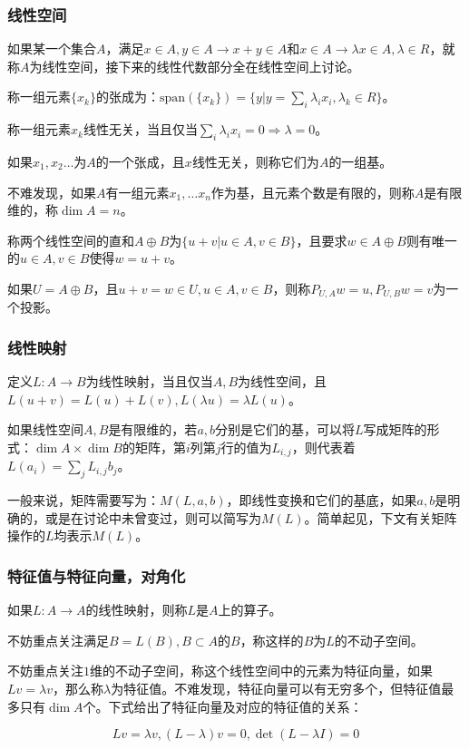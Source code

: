 \documentclass[10pt]{beamer}
\begin{document}
	\begin{frame}
		\frametitle{线性空间}
	
		如果某一个集合$A$，满足$x\in A,y\in A\rightarrow x+y\in A$和$x\in A\rightarrow \lambda x\in A,\lambda\in R$，就称$A$为线性空间，接下来的线性代数部分全在线性空间上讨论。

		称一组元素$\{x_k\}$的张成为：$\mathrm{span}(\{x_k\})=\{y|y=\sum_i \lambda_ix_i,\lambda_k\in R\}$。

		称一组元素$x_k$线性无关，当且仅当$\sum_i \lambda_ix_i=0\Rightarrow \lambda=0$。

		如果$x_1,x_2\dots$为$A$的一个张成，且$x$线性无关，则称它们为$A$的一组基。

		不难发现，如果$A$有一组元素$x_1,\dots x_n$作为基，且元素个数是有限的，则称$A$是有限维的，称$\dim A=n$。

		称两个线性空间的直和$A\oplus B$为$\{u+v|u\in A,v\in B\}$，且要求$w\in A\oplus B$则有唯一的$u\in A,v\in B$使得$w=u+v$。

		如果$U=A\oplus B$，且$u+v=w\in U,u\in A,v\in B$，则称$P_{U,A}w=u,P_{U,B}w=v$为一个投影。
	
	\end{frame}
	\begin{frame}
		\frametitle{线性映射}
	
		定义$L:A\rightarrow B$为线性映射，当且仅当$A,B$为线性空间，且$L(u+v)=L(u)+L(v),L(\lambda u)=\lambda L(u)$。

		如果线性空间$A,B$是有限维的，若$a,b$分别是它们的基，可以将$L$写成矩阵的形式：$\dim A\times \dim B$的矩阵，第$i$列第$j$行的值为$L_{i,j}$，则代表着$L(a_i)=\sum_j L_{i,j}b_j$。

		一般来说，矩阵需要写为：$M(L,a,b)$，即线性变换和它们的基底，如果$a,b$是明确的，或是在讨论中未曾变过，则可以简写为$M(L)$。简单起见，下文有关矩阵操作的$L$均表示$M(L)$。
	
	\end{frame}
	\begin{frame}
		\frametitle{特征值与特征向量，对角化}
	
		如果$L:A\rightarrow A$的线性映射，则称$L$是$A$上的算子。

		不妨重点关注满足$B=L(B),B\subset A$的$B$，称这样的$B$为$L$的不动子空间。

		不妨重点关注$1$维的不动子空间，称这个线性空间中的元素为特征向量，如果$Lv=\lambda v$，那么称$\lambda$为特征值。不难发现，特征向量可以有无穷多个，但特征值最多只有$\dim A$个。下式给出了特征向量及对应的特征值的关系：

		$$
		Lv=\lambda v,(L-\lambda)v=0,\det(L-\lambda I)=0
		$$
	\end{frame}
\end{document}
